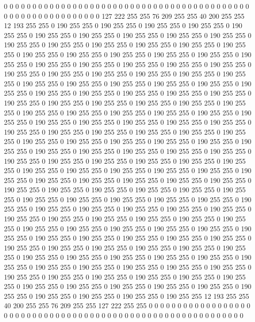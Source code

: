 0 0 0 0 0 0 0 0 0 0 0 0 0 0 0 0 0 0 0 0 0 0 0 0 0 0 0 0 0 0 0 0 0 0 0 0 0 0 0 0 0 0 0 0 0 0 0 0 0 0 0 0 0 0 0 0 0 0 0 0 127 222 255 255 76 209 255 255 40 200 255 255 12 193 255 255 0 190 255 255 0 190 255 255 0 190 255 255 0 190 255 255 0 190 255 255 0 190 255 255 0 190 255 255 0 190 255 255 0 190 255 255 0 190 255 255 0 190 255 255 0 190 255 255 0 190 255 255 0 190 255 255 0 190 255 255 0 190 255 255 0 190 255 255 0 190 255 255 0 190 255 255 0 190 255 255 0 190 255 255 0 190 255 255 0 190 255 255 0 190 255 255 0 190 255 255 0 190 255 255 0 190 255 255 0 190 255 255 0 190 255 255 0 190 255 255 0 190 255 255 
0 190 255 255 0 190 255 255 0 190 255 255 0 190 255 255 0 190 255 255 0 190 255 255 0 190 255 255 0 190 255 255 0 190 255 255 0 190 255 255 0 190 255 255 0 190 255 255 0 190 255 255 0 190 255 255 0 190 255 255 0 190 255 255 0 190 255 255 0 190 255 255 0 190 255 255 0 190 255 255 0 190 255 255 0 190 255 255 0 190 255 255 0 190 255 255 0 190 255 255 0 190 255 255 0 190 255 255 0 190 255 255 0 190 255 255 0 190 255 255 0 190 255 255 0 190 255 255 0 190 255 255 0 190 255 255 0 190 255 255 0 190 255 255 0 190 255 255 0 190 255 255 0 190 255 255 0 190 255 255 0 190 255 255 0 190 255 255 0 190 255 255 0 190 255 255 0 190 255 255 0 190 255 255 0 190 255 255 0 190 255 255 0 190 255 255 0 190 255 255 
0 190 255 255 0 190 255 255 0 190 255 255 0 190 255 255 0 190 255 255 0 190 255 255 0 190 255 255 0 190 255 255 0 190 255 255 0 190 255 255 0 190 255 255 0 190 255 255 0 190 255 255 0 190 255 255 0 190 255 255 0 190 255 255 0 190 255 255 0 190 255 255 0 190 255 255 0 190 255 255 0 190 255 255 0 190 255 255 0 190 255 255 0 190 255 255 0 190 255 255 0 190 255 255 0 190 255 255 0 190 255 255 0 190 255 255 0 190 255 255 0 190 255 255 0 190 255 255 0 190 255 255 0 190 255 255 0 190 255 255 0 190 255 255 0 190 255 255 0 190 255 255 0 190 255 255 0 190 255 255 0 190 255 255 0 190 255 255 0 190 255 255 0 190 255 255 0 190 255 255 0 190 255 255 0 190 255 255 0 190 255 255 0 190 255 255 0 190 255 255 
0 190 255 255 0 190 255 255 0 190 255 255 0 190 255 255 0 190 255 255 0 190 255 255 0 190 255 255 0 190 255 255 0 190 255 255 0 190 255 255 0 190 255 255 0 190 255 255 0 190 255 255 0 190 255 255 0 190 255 255 0 190 255 255 0 190 255 255 0 190 255 255 0 190 255 255 0 190 255 255 0 190 255 255 0 190 255 255 0 190 255 255 0 190 255 255 0 190 255 255 0 190 255 255 0 190 255 255 0 190 255 255 0 190 255 255 0 190 255 255 0 190 255 255 12 193 255 255 40 200 255 255 76 209 255 255 127 222 255 255 0 0 0 0 0 0 0 0 0 0 0 0 0 0 0 0 0 0 0 0 0 0 0 0 0 0 0 0 0 0 0 0 0 0 0 0 0 0 0 0 0 0 0 0 0 0 0 0 0 0 0 0 0 0 0 0 0 0 0 0